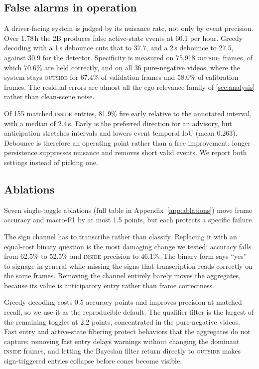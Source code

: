 \documentclass[journal]{IEEEtran}
\newcommand{\st}[1]{\textsc{#1}}
\begin{document}
\subsection{False alarms in operation}
\label{sec:falsealarms}

A driver-facing system is judged by its nuisance rate, not only by event precision.  Over 1.78\,h the 2B produces false active-state events at 60.1 per hour.  Greedy decoding with a 1\,s debounce cuts that to 37.7, and a 2\,s debounce to 27.5, against 30.9 for the detector.  Specificity is measured on 75{,}918 \st{outside} frames, of which 70.6\% are held correctly, and on all 36 pure-negative videos, where the system stays \st{outside} for 67.4\% of validation frames and 58.0\% of calibration frames.  The residual errors are almost all the ego-relevance family of \cref{sec:analysis} rather than clean-scene noise.

Of 155 matched \st{inside} entries, 81.9\% fire early relative to the annotated interval, with a median of 2.4\,s.  Early is the preferred direction for an advisory, but anticipation stretches intervals and lowers event temporal IoU (mean 0.263).  Debounce is therefore an operating point rather than a free improvement: longer persistence suppresses nuisance and removes short valid events.  We report both settings instead of picking one.

\subsection{Ablations}
\label{sec:ablations}

Seven single-toggle ablations (full table in Appendix~\ref{app:ablations}) move frame accuracy and macro-F1 by at most 1.5 points, but each protects a specific failure.

The sign channel has to transcribe rather than classify.  Replacing it with an equal-cost binary question is the most damaging change we tested: accuracy falls from 62.5\% to 52.5\% and \st{inside} precision to 46.1\%.  The binary form says ``yes'' to signage in general while missing the signs that transcription reads correctly on the same frames.  Removing the channel entirely barely moves the aggregates, because its value is anticipatory entry rather than frame correctness.

Greedy decoding costs 0.5 accuracy points and improves precision at matched recall, so we use it as the reproducible default.  The qualifier filter is the largest of the remaining toggles at 2.2 points, concentrated in the pure-negative videos.  Fast entry and active-state filtering protect behaviors that the aggregates do not capture: removing fast entry delays warnings without changing the dominant \st{inside} frames, and letting the Bayesian filter return directly to \st{outside} makes sign-triggered entries collapse before cones become visible.
\end{document}
